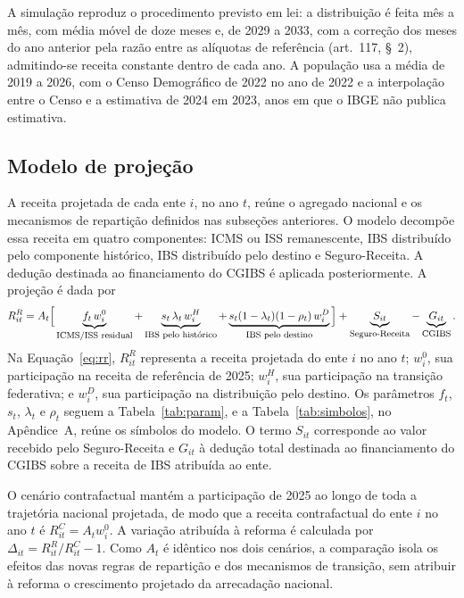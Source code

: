 \documentclass[12pt,a4paper]{article}
\begin{document}
A simulação reproduz o procedimento previsto em lei: a distribuição é feita mês a mês, com média móvel de doze meses e, de 2029 a 2033, com a correção dos meses do ano anterior pela razão entre as alíquotas de referência (art.~117, \S~2\textordmasculine), admitindo-se receita constante dentro de cada ano. A população usa a média de 2019 a 2026, com o Censo Demográfico de 2022 no ano de 2022 e a interpolação entre o Censo e a estimativa de 2024 em 2023, anos em que o IBGE não publica estimativa.

\subsection{Modelo de projeção}

A receita projetada de cada ente $i$, no ano $t$, reúne o agregado nacional e os mecanismos de repartição definidos nas subseções anteriores. O modelo decompõe essa receita em quatro componentes: ICMS ou ISS remanescente, IBS distribuído pelo componente histórico, IBS distribuído pelo destino e Seguro-Receita. A dedução destinada ao financiamento do CGIBS é aplicada posteriormente. A projeção é dada por
\begingroup\small
\begin{equation}\label{eq:rr}
  R^{R}_{it}=A_{t}\Big[\underbrace{f_{t}\,w^{0}_{i}}_{\text{\footnotesize ICMS/ISS residual}}+\underbrace{s_{t}\,\lambda_{t}\,w^{H}_{i}}_{\text{\footnotesize IBS pelo histórico}}+\underbrace{s_{t}(1-\lambda_{t})(1-\rho_{t})\,w^{D}_{i}}_{\text{\footnotesize IBS pelo destino}}\Big]+\underbrace{S_{it}}_{\text{\footnotesize Seguro-Receita}}-\underbrace{G_{it}}_{\text{\footnotesize CGIBS}}.
\end{equation}
\endgroup
Na Equação~\eqref{eq:rr}, $R^{R}_{it}$ representa a receita projetada do ente $i$ no ano $t$; $w^{0}_{i}$, sua participação na receita de referência de 2025; $w^{H}_{i}$, sua participação na transição federativa; e $w^{D}_{i}$, sua participação na distribuição pelo destino. Os parâmetros $f_{t}$, $s_{t}$, $\lambda_{t}$ e $\rho_{t}$ seguem a Tabela~\ref{tab:param}, e a Tabela~\ref{tab:simbolos}, no Apêndice~A, reúne os símbolos do modelo. O termo $S_{it}$ corresponde ao valor recebido pelo Seguro-Receita e $G_{it}$ à dedução total destinada ao financiamento do CGIBS sobre a receita de IBS atribuída ao ente.

O cenário contrafactual mantém a participação de 2025 ao longo de toda a trajetória nacional projetada, de modo que a receita contrafactual do ente $i$ no ano $t$ é $R^{C}_{it}=A_{t}w^{0}_{i}$. A variação atribuída à reforma é calculada por $\Delta_{it}=R^{R}_{it}/R^{C}_{it}-1$. Como $A_{t}$ é idêntico nos dois cenários, a comparação isola os efeitos das novas regras de repartição e dos mecanismos de transição, sem atribuir à reforma o crescimento projetado da arrecadação nacional.
\end{document}
